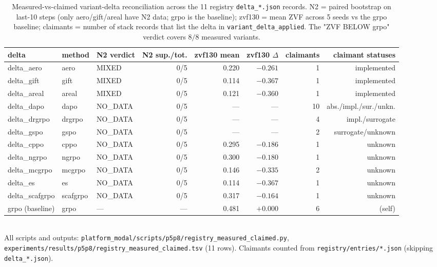 \documentclass{article}
\begin{document}
\begin{table}[t]
\centering
\caption{Measured-vs-claimed variant-delta reconciliation across the
11 registry \texttt{delta\_*.json} records. N2 = paired bootstrap on
last-10 steps (only aero/gift/areal have N2 data; grpo is the
baseline); zvf130 = mean ZVF across 5 seeds vs the grpo baseline;
claimants = number of stack records that list the delta in
\texttt{variant\_delta\_applied}. The "ZVF BELOW grpo" verdict covers
$8/8$ measured variants.}
\label{tab:p6-measured-claimed}
\small
\begin{tabular}{lllrrrrr}
\toprule
delta & method & N2 verdict & N2 sup./tot. & zvf130 mean & zvf130 $\Delta$ & claimants & claimant statuses \\
\midrule
delta\_aero    & aero    & MIXED    & 0/5 & 0.220 & $-0.261$ & 1  & implemented \\
delta\_gift    & gift    & MIXED    & 0/5 & 0.114 & $-0.367$ & 1  & implemented \\
delta\_areal   & areal   & MIXED    & 0/5 & 0.121 & $-0.360$ & 1  & implemented \\
delta\_dapo    & dapo    & NO\_DATA & 0/5 & ---   & ---      & 10 & abs./impl./sur./unkn. \\
delta\_drgrpo  & drgrpo  & NO\_DATA & 0/5 & ---   & ---      & 4  & impl./surrogate \\
delta\_gspo    & gspo    & NO\_DATA & 0/5 & ---   & ---      & 2  & surrogate/unknown \\
delta\_cppo    & cppo    & NO\_DATA & 0/5 & 0.295 & $-0.186$ & 1  & unknown \\
delta\_ngrpo   & ngrpo   & NO\_DATA & 0/5 & 0.300 & $-0.180$ & 1  & unknown \\
delta\_mcgrpo  & mcgrpo  & NO\_DATA & 0/5 & 0.146 & $-0.335$ & 2  & unknown \\
delta\_es      & es      & NO\_DATA & 0/5 & 0.114 & $-0.367$ & 1  & unknown \\
delta\_scafgrpo& scafgrpo& NO\_DATA & 0/5 & 0.317 & $-0.164$ & 1  & unknown \\
\midrule
grpo (baseline) & grpo  & ---      & ---  & 0.481 & $+0.000$ & 6  & (self) \\
\bottomrule
\end{tabular}\\
\footnotesize{All scripts and outputs:
\texttt{platform_modal/scripts/p5p8/registry\_measured\_claimed.py},
\texttt{experiments/results/p5p8/registry\_measured\_claimed.tsv} (11
rows). Claimants counted from
\texttt{registry/entries/*.json} (skipping \texttt{delta\_*.json}).
}
\end{table}
\end{document}
